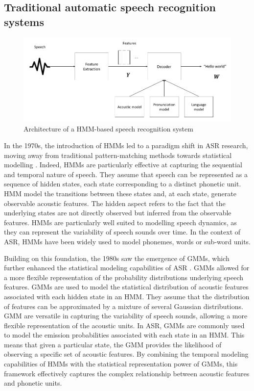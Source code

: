 \subsection{Traditional automatic speech recognition systems} %
\begin{figure}
\includegraphics[width=\textwidth]{imgs/HMM-GMM_architecture.png}
\caption{Architecture of a HMM-based speech recognition system}
\label{HMM-GMM-model}
\end{figure}

In the 1970s, the introduction of \acp{HMM} led to a paradigm shift in \ac{ASR} research, moving away from traditional pattern-matching methods towards statistical modelling \cite{first_asr}. Indeed, \acp{HMM} are particularly effective at capturing the sequential and temporal nature of speech. They assume that speech can be represented as a sequence of hidden states, each state corresponding to a distinct phonetic unit. \ac{HMM} model the transitions between these states and, at each state, generate observable acoustic features. The hidden aspect refers to the fact that the underlying states are not directly observed but inferred from the observable features. \acp{HMM} are particularly well suited to modelling speech dynamics, as they can represent the variability of speech sounds over time. In the context of \ac{ASR}, \acp{HMM} have been widely used to model phonemes, words or sub-word units.

Building on this foundation, the 1980s saw the emergence of \acp{GMM}, which further enhanced the statistical modeling capabilities of \ac{ASR} \cite{htk_book}. \acp{GMM} allowed for a more flexible representation of the probability distributions underlying speech features.
\acp{GMM} are used to model the statistical distribution of acoustic features associated with each hidden state in an \ac{HMM}. They assume that the distribution of features can be approximated by a mixture of several Gaussian distributions. \ac{GMM} are versatile in capturing the variability of speech sounds, allowing a more flexible representation of the acoustic units. In \ac{ASR}, \acp{GMM} are commonly used to model the emission probabilities associated with each state in an \ac{HMM}. This means that given a particular state, the \ac{GMM} provides the likelihood of observing a specific set of acoustic features. By combining the temporal modeling capabilities of \acp{HMM} with the statistical representation power of \acp{GMM}, this framework effectively captures the complex relationship between acoustic features and phonetic units.

